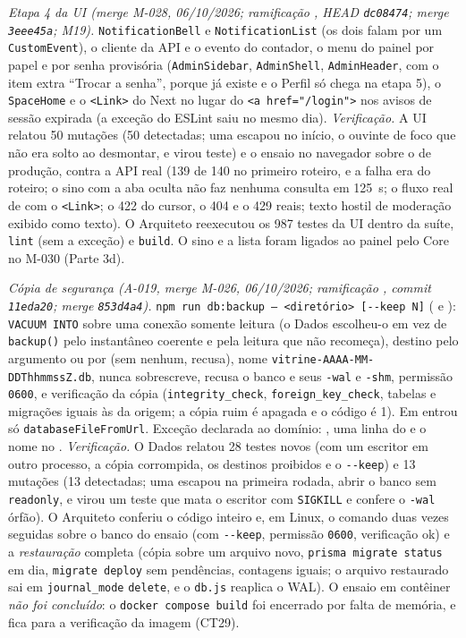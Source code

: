 \emph{Etapa 4 da UI (merge M-028, 06/10/2026; ramificação , HEAD \texttt{dc08474}; merge \texttt{3eee45a}; M19).} \texttt{NotificationBell} e \texttt{NotificationList} (os dois falam por um \texttt{CustomEvent}), o cliente da API e o evento do contador, o menu do painel por papel e por senha provisória (\texttt{AdminSidebar}, \texttt{AdminShell}, \texttt{AdminHeader}, com o item extra ``Trocar a senha'', porque  já existe e o Perfil só chega na etapa 5), o \texttt{SpaceHome} e o \texttt{<Link>} do Next no lugar do \texttt{<a href="/login">} nos avisos de sessão expirada (a exceção do ESLint saiu no mesmo dia). \emph{Verificação.} A UI relatou 50 mutações (50 detectadas; uma escapou no início, o ouvinte de foco que não era solto ao desmontar, e virou teste) e o ensaio no navegador sobre o  de produção, contra a API real (139 de 140 no primeiro roteiro, e a falha era do roteiro; o sino com a aba oculta não faz nenhuma consulta em 125~s; o fluxo real de  com o \texttt{<Link>}; o 422 do cursor, o 404 e o 429 reais; texto hostil de moderação exibido como texto). O Arquiteto reexecutou os 987 testes da UI dentro da suíte, \texttt{lint} (sem a exceção) e \texttt{build}. O sino e a lista foram ligados ao painel pelo Core no M-030 (Parte 3d).

\emph{Cópia de segurança (A-019, merge M-026, 06/10/2026; ramificação , commit \texttt{11eda20}; merge \texttt{853d4a4}).} \texttt{npm run db:backup -- <diretório> [-{}-keep N]} ( e ): \texttt{VACUUM INTO} sobre uma conexão somente leitura (o Dados escolheu-o em vez de \texttt{backup()} pelo instantâneo coerente e pela leitura que não recomeça), destino pelo argumento ou por  (sem nenhum, recusa), nome \texttt{vitrine-AAAA-MM-DDThhmmssZ.db}, nunca sobrescreve, recusa o banco e seus \texttt{-wal} e \texttt{-shm}, permissão \texttt{0600}, e verificação da cópia (\texttt{integrity\_check}, \texttt{foreign\_key\_check}, tabelas e migrações iguais às da origem; a cópia ruim é apagada e o código é 1). Em  entrou só \texttt{databaseFileFromUrl}. Exceção declarada ao domínio: , uma linha do  e o nome  no . \emph{Verificação.} O Dados relatou 28 testes novos (com um escritor em outro processo, a cópia corrompida, os destinos proibidos e o \texttt{-{}-keep}) e 13 mutações (13 detectadas; uma escapou na primeira rodada, abrir o banco sem \texttt{readonly}, e virou um teste que mata o escritor com \texttt{SIGKILL} e confere o \texttt{-wal} órfão). O Arquiteto conferiu o código inteiro e, em Linux, o comando duas vezes seguidas sobre o banco do ensaio (com \texttt{-{}-keep}, permissão \texttt{0600}, verificação ok) e a \emph{restauração} completa (cópia sobre um arquivo novo, \texttt{prisma migrate status} em dia, \texttt{migrate deploy} sem pendências, contagens iguais; o arquivo restaurado sai em \texttt{journal\_mode} \texttt{delete}, e o \texttt{db.js} reaplica o WAL). O ensaio em contêiner \emph{não foi concluído}: o \texttt{docker compose build} foi encerrado por falta de memória, e fica para a verificação da imagem (CT29).

